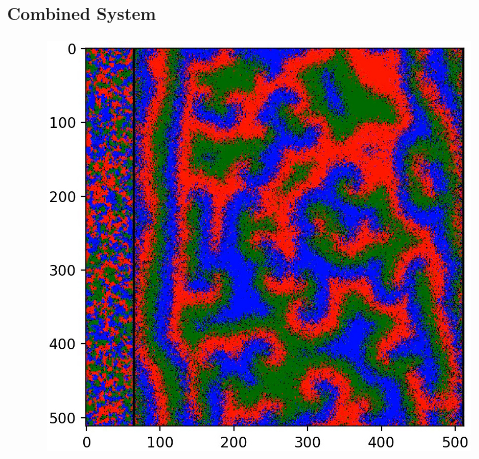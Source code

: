 \documentclass{beamer}
\begin{document}
    \begin{frame}
        \frametitle{Combined System}
        \begin{figure}[h]
            \centering
            \vspace{-5pt}

            \includegraphics[height=\textheight]{images/plane_wave_new_2.jpg}
        \end{figure}
    \end{frame}
\end{document}
